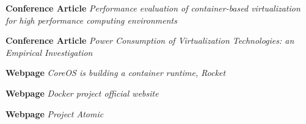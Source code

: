 \documentclass{article}
\begin{document}
\medskip

\textbf{Conference Article} \emph{Performance evaluation of container-based virtualization for 
high performance computing environments}\cite{xavier2013performance}

\medskip

\textbf{Conference Article} \emph{Power Consumption of Virtualization Technologies: an 
Empirical Investigation}\cite{morabito2015power}

\medskip

\textbf{Webpage} \emph{CoreOS is building a container runtime, Rocket}\cite{rocketwb}

\medskip

\textbf{Webpage} \emph{Docker project official website}\cite{dockerwb}

\medskip

\textbf{Webpage} \emph{Project Atomic}\cite{RHELatomic}






\end{document}
